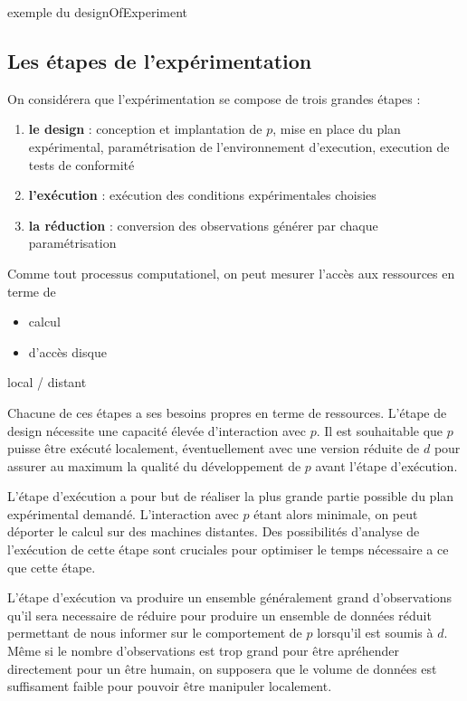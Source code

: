 exemple du designOfExperiment 

\subsection{Les étapes de l'expérimentation}

On considérera que l'expérimentation se compose de trois grandes étapes :
\begin{enumerate}
  \item \textbf{le design} : conception et implantation de $p$, mise en place du plan expérimental, paramétrisation de l'environnement d'execution, execution de tests de conformité
  \item \textbf{l'exécution} : exécution des conditions expérimentales choisies
  \item \textbf{la réduction} : conversion des observations générer par chaque paramétrisation
\end{enumerate}

Comme tout processus computationel, on peut mesurer l'accès aux ressources en terme de
\begin{itemize}
  \item calcul
  \item d'accès disque
\end{itemize}

local / distant

Chacune de ces étapes a ses besoins propres en terme de ressources. L'étape de design nécessite une capacité élevée d'interaction avec $p$. Il est souhaitable que $p$ puisse être exécuté localement, éventuellement avec une version réduite de $d$ pour assurer au maximum la qualité du développement de $p$ avant l'étape d'exécution.

L'étape d'exécution a pour but de réaliser la plus grande partie possible du plan expérimental demandé. L'interaction avec $p$ étant alors minimale, on peut déporter le calcul sur des machines distantes. Des possibilités d'analyse de l'exécution de cette étape sont cruciales pour optimiser le temps nécessaire a ce que cette étape.

L'étape d'exécution va produire un ensemble généralement grand d'observations qu'il sera necessaire de réduire pour produire un ensemble de données réduit permettant de nous informer sur le comportement de $p$ lorsqu'il est soumis à $d$. Même si le nombre d'observations est trop grand pour être apréhender directement pour un être humain, on supposera que le volume de données est suffisament faible pour pouvoir être manipuler localement.


